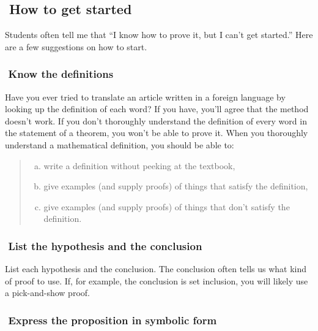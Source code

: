 \documentclass[12pt]{article}
\newenvironment{alphalist}{
  \begin{enumerate}[(a)]
    \addtolength{\itemsep}{-1.0\itemsep}}
  {\end{enumerate}}
\newcounter{ex}\setcounter{ex}{0}
\newcounter{id}\setcounter{id}{0}
\newcommand{\id}{%
\hspace{-0.2in} \setcounter{id}{\value{id}+1}
\theid \,\,}
\newcounter{se}\setcounter{se}{0}
\newcommand{\se}{%
\hspace{-0.2in} \setcounter{se}{\value{se}+1}
\these \,\,}
\begin{document}
\setcounter{id}{0}

\subsection* {\se How to get started}

Students often tell me that ``I know how to prove it, but I can't get started.''  Here are a few suggestions on how to start.


\subsubsection*{\id Know the definitions}

Have you ever tried to translate an article written in a foreign language by looking up the definition of each word?  If you have, you'll agree that the method doesn't work.  If you don't thoroughly understand the definition of every word in the statement of a theorem, you won't be able to prove it.  When you thoroughly understand a mathematical definition, you should be able to:


\begin{quote}
\begin{alphalist}

\item write a definition without peeking at the textbook,

\item give examples (and supply proofs) of things that satisfy the definition, 

\item give examples (and supply proofs) of things  that don't satisfy the definition.

\end{alphalist}
\end{quote}

\subsubsection*{\id List the hypothesis and the conclusion}

List each hypothesis and the conclusion. The conclusion often tells us what kind of proof to use. If, for example,
the conclusion is set inclusion, you will likely use a pick-and-show proof.

\subsubsection*{\id Express the proposition in symbolic form}
\end{document}
